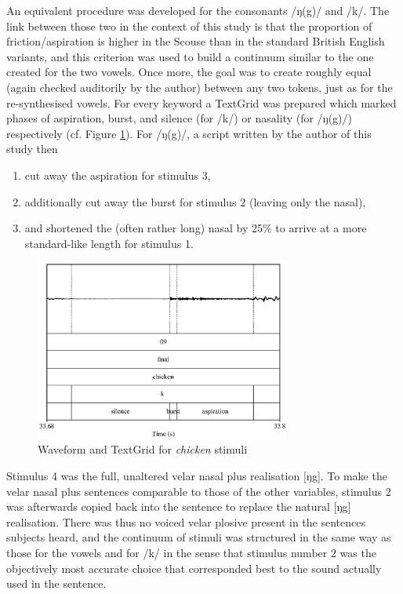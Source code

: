 An equivalent procedure was developed for the consonants /ŋ(g)/ and /k/.
The link between those two in the context of this study is that the proportion of friction/aspiration is higher in the Scouse than in the standard British English variants, and this criterion was used to build a continuum similar to the one created for the two vowels.
Once more, the goal was to create roughly equal  (again checked auditorily by the author) between any two tokens, just as for the re-synthesised vowels.
For every keyword a TextGrid was prepared which marked phases of aspiration, burst, and silence (for /k/) or nasality (for /ŋ(g)/) respectively (cf. Figure \ref{fig.chicken.spec}).
For /ŋ(g)/, a script written by the author of this study then

\begin{enumerate}
	\item cut away the aspiration for stimulus 3,
	\item additionally cut away the burst for stimulus 2 (leaving only the nasal),
	\item and shortened the (often rather long) nasal by 25\% to arrive at a more standard-like length for stimulus 1.
\end{enumerate}

\begin{figure}[h]
	\centering
	\includegraphics[width=0.75\textwidth]{./figures/chicken_spectrogram}
	\caption{Waveform and TextGrid for \emph{chicken} stimuli}
	\label{fig.chicken.spec}
\end{figure}

Stimulus 4 was the full, unaltered velar nasal plus realisation [ŋg].
To make the velar nasal plus sentences comparable to those of the other variables, stimulus 2 was afterwards copied back into the sentence to replace the natural [ŋg] realisation.
There was thus no voiced velar plosive present in the sentences subjects heard, and the continuum of stimuli was structured in the same way as those for the vowels and for /k/ in the sense that stimulus number 2 was the objectively most accurate choice that corresponded best to the sound actually used in the sentence.

